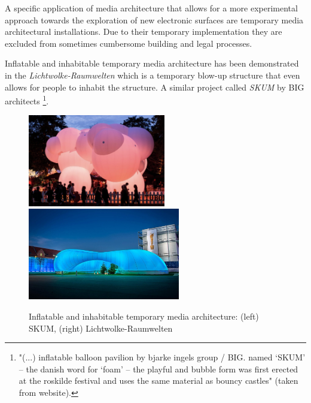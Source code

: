 
A specific application of media architecture that allows for a more experimental approach towards the exploration of new electronic surfaces are temporary media architectural installations. Due to their temporary implementation they are excluded from sometimes cumbersome building and legal processes.

Inflatable and inhabitable temporary media architecture has been demonstrated in the \textit{Lichtwolke-Raumwelten}  which is a temporary blow-up structure that even allows for people to inhabit the structure. A similar project called \textit{SKUM}  by BIG architects \footnote{"(...) inflatable balloon pavilion by bjarke ingels group / BIG. named ‘SKUM’ – the danish word for ‘foam’ – the playful and bubble form was first erected at the roskilde festival and uses the same material as bouncy castles" (taken from website).}.



\begin{figure} [h!]
    \centering
        \includegraphics[height=4cm]{Illustrations/skum.png}
        \includegraphics[height=4cm]{Illustrations/Lichtwolke.jpg}
    \caption[Inflatable and inhabitable temporary media architecture]{Inflatable and inhabitable temporary media architecture: (left) SKUM, (right) Lichtwolke-Raumwelten}
    \label{InterfacingArchitecture}
\end{figure}


